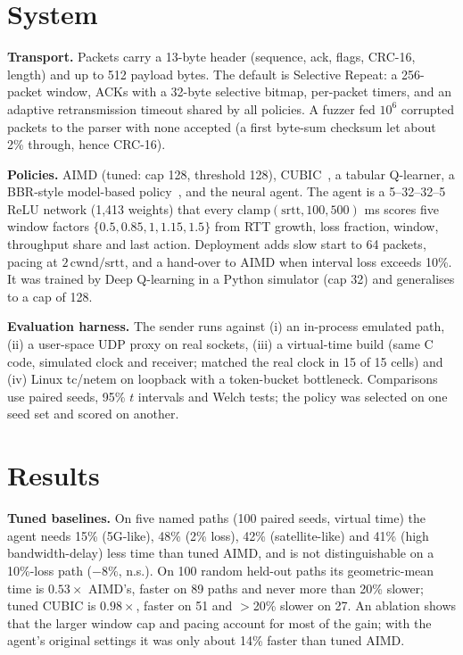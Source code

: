 \documentclass[10pt,twocolumn]{article}
\begin{document}
\section{System}
\textbf{Transport.} Packets carry a 13-byte header (sequence, ack, flags, CRC-16, length) and up to 512 payload bytes. The default is Selective Repeat: a 256-packet window, ACKs with a 32-byte selective bitmap, per-packet timers, and an adaptive retransmission timeout shared by all policies. A fuzzer fed $10^6$ corrupted packets to the parser with none accepted (a first byte-sum checksum let about 2\% through, hence CRC-16).

\textbf{Policies.} AIMD (tuned: cap 128, threshold 128), CUBIC~\cite{cubic}, a tabular Q-learner, a BBR-style model-based policy~\cite{bbr}, and the neural agent. The agent is a 5--32--32--5 ReLU network (1,413 weights) that every $\mathrm{clamp}(\mathrm{srtt},100,500)$ ms scores five window factors $\{0.5,0.85,1,1.15,1.5\}$ from RTT growth, loss fraction, window, throughput share and last action. Deployment adds slow start to 64 packets, pacing at $2\,\mathrm{cwnd}/\mathrm{srtt}$, and a hand-over to AIMD when interval loss exceeds 10\%. It was trained by Deep Q-learning in a Python simulator (cap 32) and generalises to a cap of 128.

\textbf{Evaluation harness.} The sender runs against (i) an in-process emulated path, (ii) a user-space UDP proxy on real sockets, (iii) a virtual-time build (same C code, simulated clock and receiver; matched the real clock in 15 of 15 cells) and (iv) Linux tc/netem on loopback with a token-bucket bottleneck. Comparisons use paired seeds, 95\% $t$ intervals and Welch tests; the policy was selected on one seed set and scored on another.

\section{Results}
\textbf{Tuned baselines.} On five named paths (100 paired seeds, virtual time) the agent needs 15\% (5G-like), 48\% (2\% loss), 42\% (satellite-like) and 41\% (high bandwidth-delay) less time than tuned AIMD, and is not distinguishable on a 10\%-loss path ($-8\%$, n.s.). On 100 random held-out paths its geometric-mean time is $0.53\times$ AIMD's, faster on 89 paths and never more than 20\% slower; tuned CUBIC is $0.98\times$, faster on 51 and $>$20\% slower on 27. An ablation shows that the larger window cap and pacing account for most of the gain; with the agent's original settings it was only about 14\% faster than tuned AIMD.
\end{document}
